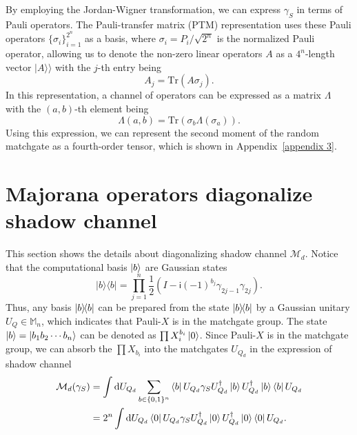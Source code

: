\documentclass[showpacs,onecolumn,aps,prx,long bibliography,superscriptaddress,notitlepage]{revtex4-1}
\newcommand{\ii}{\mathsf{i}}
\newcommand{\supket}[1]{|#1 \rangle\rangle}
\newcommand{\cbra}[1]{\{ #1 \}}
\newcommand{\Mbb}{\mathbb{M}}
\begin{document}
By employing the Jordan-Wigner transformation, we can express $\gamma_S$ in terms of Pauli operators. The Pauli-transfer matrix (PTM) representation uses these Pauli operators $\cbra{\sigma_i}_{i=1}^{2^n}$ as a basis, where $\sigma_i =P_i/\sqrt{2^n}$ is the normalized Pauli operator, allowing us to denote the non-zero linear operators $A$ as a $4^n$-length vector $\supket{A}$ with the $j$-th entry being
\begin{equation}
A_j = \text{Tr}(A \sigma_j).
\end{equation}
In this representation, a channel of operators can be expressed as a matrix $\Lambda$ with the $(a,b)$-th element being
\begin{equation}
\Lambda(a,b) = \text{Tr}(\sigma_b \Lambda(\sigma_a)).
\end{equation}
Using this expression, we can represent the second moment of the random matchgate as a fourth-order tensor, which is shown in Appendix~\ref{appendix 3}.



\section{Majorana operators diagonalize shadow channel}
\label{appendix: 1}


This section shows the details about diagonalizing shadow channel $\mathcal{M}_d$. 
Notice that the computational basis $\ket{b}$ are Gaussian states
\begin{equation}
    |b\rangle\langle b|=\prod_{j=1}^n \frac{1}{2}\left(I-\ii(-1)^{b_j} \gamma_{2 j-1} \gamma_{2 j}\right).
\end{equation}
Thus, any basis $\ketbra{b}{b}$ can be prepared from the state $\ketbra{b}{b}$ by a Gaussian unitary $U_Q\in \Mbb_n$, which indicates that Pauli-$X$ is in the matchgate group. 
The state $\ket{b}= \ket{b_1b_2\cdots b_n}$ can be denoted as $\prod X_{i}^{b_i} \ket{0}$. 
Since Pauli-$X$ is in the matchgate group, we can absorb the $\prod X_{b_i}$ into the matchgates $U_{Q_d}$ in the expression of shadow channel
\begin{align}
\mathcal{M}_d(\gamma_S) &= \int \dd U_{Q_d}\sum_{b\in\{0,1\}^n}\bra{b}U_{Q_d}\gamma_S U_{Q_d}^\dagger \ket{b} U_{Q_d}^\dagger \ket{b}\bra{b}U_{Q_d}\\
&= 2^n\int \dd U_{Q_d} \bra{0}U_{Q_d}\gamma_S U_{Q_d}^\dagger \ket{0} U_{Q_d}^\dagger \ket{0}\bra{0}U_{Q_d}.
\end{align}
\end{document}
